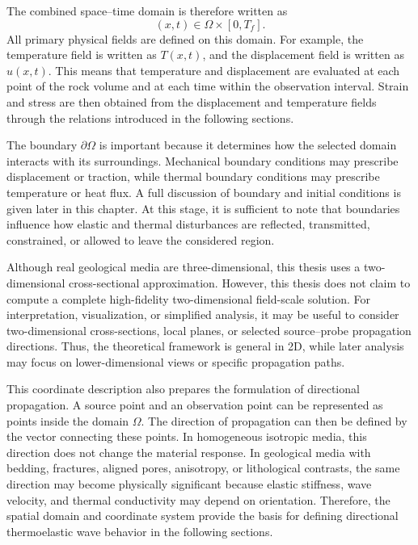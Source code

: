 The combined space--time domain is therefore written as
\begin{equation}
(x,t) \in \Omega \times [0,T_f].
\end{equation}
All primary physical fields are defined on this domain. For example, the temperature field is written as \(T(x,t)\), and the displacement field is written as \(u(x,t)\). This means that temperature and displacement are evaluated at each point of the rock volume and at each time within the observation interval. Strain and stress are then obtained from the displacement and temperature fields through the relations introduced in the following sections.

The boundary \(\partial\Omega\) is important because it determines how the selected domain interacts with its surroundings. Mechanical boundary conditions may prescribe displacement or traction, while thermal boundary conditions may prescribe temperature or heat flux. A full discussion of boundary and initial conditions is given later in this chapter. At this stage, it is sufficient to note that boundaries influence how elastic and thermal disturbances are reflected, transmitted, constrained, or allowed to leave the considered region.

Although real geological media are three-dimensional, this thesis uses a two-dimensional cross-sectional approximation. However, this thesis does not claim to compute a complete high-fidelity two-dimensional field-scale solution. For interpretation, visualization, or simplified analysis, it may be useful to consider two-dimensional cross-sections, local planes, or selected source--probe propagation directions. Thus, the theoretical framework is general in 2D, while later analysis may focus on lower-dimensional views or specific propagation paths.

This coordinate description also prepares the formulation of directional propagation. A source point and an observation point can be represented as points inside the domain \(\Omega\). The direction of propagation can then be defined by the vector connecting these points. In homogeneous isotropic media, this direction does not change the material response. In geological media with bedding, fractures, aligned pores, anisotropy, or lithological contrasts, the same direction may become physically significant because elastic stiffness, wave velocity, and thermal conductivity may depend on orientation. Therefore, the spatial domain and coordinate system provide the basis for defining directional thermoelastic wave behavior in the following sections.